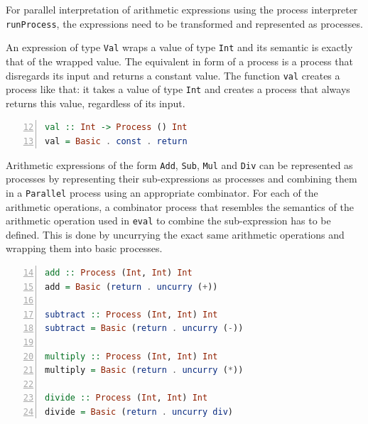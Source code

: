 For parallel interpretation of arithmetic expressions using the process interpreter \texttt{runProcess}, the expressions need to be transformed and represented as processes.

An expression of type \texttt{Val} wraps a value of type \texttt{Int} and its semantic is exactly that of the wrapped value. The equivalent in form of a process is a process that disregards its input and returns a constant value. The function \texttt{val} creates a process like that: it takes a value of type \texttt{Int} and creates a process that always returns this value, regardless of its input.
\begin{lstlisting}[language=Haskell, caption=A function that generates basic processes for the representation of \texttt{Val} expressions., label=lst:arith_val, numbers=left, frame=bt, firstnumber=12]
val :: Int -> Process () Int
val = Basic . const . return
\end{lstlisting}

Arithmetic expressions of the form \texttt{Add}, \texttt{Sub}, \texttt{Mul} and \texttt{Div} can be represented as processes by representing their sub-expressions as processes and combining them in a \texttt{Parallel} process using an appropriate combinator.  For each of the arithmetic operations, a combinator process that resembles the semantics of the arithmetic operation used in \texttt{eval} to combine the sub-expression has to be defined. This is done by uncurrying the exact same arithmetic operations and wrapping them into basic processes.
\begin{lstlisting}[language=Haskell, caption=Basic processes for the combination of results from processes that have been executed in parallel., label=lst:arith_combinators,numbers=left, frame=bt, firstnumber=14]
add :: Process (Int, Int) Int
add = Basic (return . uncurry (+))

subtract :: Process (Int, Int) Int
subtract = Basic (return . uncurry (-))

multiply :: Process (Int, Int) Int
multiply = Basic (return . uncurry (*))

divide :: Process (Int, Int) Int
divide = Basic (return . uncurry div)
\end{lstlisting}

